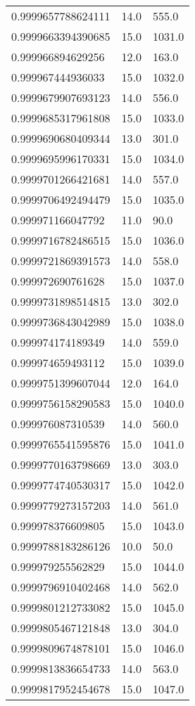 \begin{center}
\begin{supertabular}[H]{p{0.30\textwidth}p{0.05\textwidth}p{0.05\textwidth}}
0.9999657788624111 & 14.0 & 555.0 \\ 
0.9999663394390685 & 15.0 & 1031.0 \\ 
0.999966894629256 & 12.0 & 163.0 \\ 
0.999967444936033 & 15.0 & 1032.0 \\ 
0.9999679907693123 & 14.0 & 556.0 \\ 
0.9999685317961808 & 15.0 & 1033.0 \\ 
0.9999690680409344 & 13.0 & 301.0 \\ 
0.9999695996170331 & 15.0 & 1034.0 \\ 
0.9999701266421681 & 14.0 & 557.0 \\ 
0.9999706492494479 & 15.0 & 1035.0 \\ 
0.999971166047792 & 11.0 & 90.0 \\ 
0.9999716782486515 & 15.0 & 1036.0 \\ 
0.9999721869391573 & 14.0 & 558.0 \\ 
0.999972690761628 & 15.0 & 1037.0 \\ 
0.9999731898514815 & 13.0 & 302.0 \\ 
0.9999736843042989 & 15.0 & 1038.0 \\ 
0.999974174189349 & 14.0 & 559.0 \\ 
0.999974659493112 & 15.0 & 1039.0 \\ 
0.9999751399607044 & 12.0 & 164.0 \\ 
0.9999756158290583 & 15.0 & 1040.0 \\ 
0.999976087310539 & 14.0 & 560.0 \\ 
0.9999765541595876 & 15.0 & 1041.0 \\ 
0.9999770163798669 & 13.0 & 303.0 \\ 
0.9999774740530317 & 15.0 & 1042.0 \\ 
0.9999779273157203 & 14.0 & 561.0 \\ 
0.999978376609805 & 15.0 & 1043.0 \\ 
0.9999788183286126 & 10.0 & 50.0 \\ 
0.999979255562829 & 15.0 & 1044.0 \\ 
0.9999796910402468 & 14.0 & 562.0 \\ 
0.9999801212733082 & 15.0 & 1045.0 \\ 
0.9999805467121848 & 13.0 & 304.0 \\ 
0.9999809674878101 & 15.0 & 1046.0 \\ 
0.9999813836654733 & 14.0 & 563.0 \\ 
0.9999817952454678 & 15.0 & 1047.0 \\ 

\end{supertabular}
\end{center}

